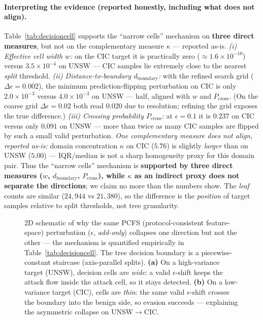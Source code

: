 \documentclass[preprint,12pt,authoryear]{elsarticle}
\begin{document}
\paragraph{Interpreting the evidence (reported honestly, including what does not
align).} Table~\ref{tab:decisioncell} supports the ``narrow cells'' mechanism on
\textbf{three direct measures}, but not on the complementary measure $\kappa$ ---
reported as-is. \emph{(i) Effective cell width $w$:} on the CIC target it is
practically zero ($\approx 1.6\times10^{-10}$) versus $3.5\times10^{-4}$ on UNSW
--- CIC samples lie extremely close to the nearest \emph{split} threshold.
\emph{(ii) Distance-to-boundary $d_{\text{boundary}}$:} with the refined search grid
($\Delta\epsilon{=}0.002$), the minimum prediction-flipping perturbation on CIC is
only $2.0\times10^{-3}$ versus $4.0\times10^{-3}$ on UNSW --- half, aligned with $w$
and $P_{\text{cross}}$. (On the coarse grid $\Delta\epsilon{=}0.02$ both read $0.020$
due to resolution; refining the grid exposes the true difference.)
\emph{(iii) Crossing probability $P_{\text{cross}}$:} at $\epsilon{=}0.1$ it is
$0.237$ on CIC versus only $0.091$ on UNSW --- more than twice as many CIC samples
are flipped by such a small valid perturbation. \emph{One complementary measure does
not align, reported as-is:} domain concentration $\kappa$ on CIC ($5.76$) is slightly
\emph{larger} than on UNSW ($5.00$) --- IQR/median is not a sharp homogeneity proxy
for this domain pair. Thus the ``narrow cells'' mechanism is \textbf{supported by
three direct measures ($w$, $d_{\text{boundary}}$, $P_{\text{cross}}$), while
$\kappa$ as an indirect proxy does not separate the directions}; we claim no more
than the numbers show. The \emph{leaf} counts are similar ($24{,}944$ vs $21{,}380$),
so the difference is the \emph{position} of target samples relative to split
thresholds, not tree granularity.

\begin{figure}[h]
\centering
\resizebox{0.95\linewidth}{!}{}
\caption{2D schematic of why the same PCFS (protocol-consistent feature-space)
perturbation ($\epsilon$, \emph{add-only}) collapses one direction but not the
other --- the mechanism is quantified empirically in Table~\ref{tab:decisioncell}.
The tree decision boundary is a piecewise-constant staircase (axis-parallel splits).
\textbf{(a)} On a high-variance target (UNSW), decision cells are \emph{wide}: a
valid $\epsilon$-shift keeps the attack flow inside the attack cell, so it stays
detected. \textbf{(b)} On a low-variance target (CIC), cells are \emph{thin}: the
same valid $\epsilon$-shift crosses the boundary into the benign side, so evasion
succeeds --- explaining the asymmetric collapse on UNSW$\rightarrow$CIC.}
\label{fig:treeboundary}
\end{figure}
\end{document}
